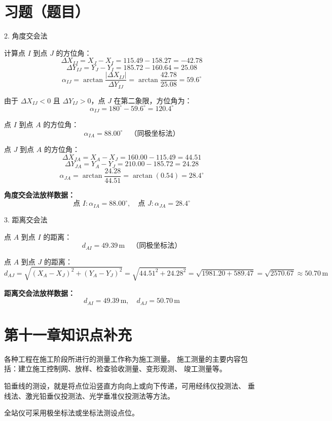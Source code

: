 \documentclass[12pt,a4paper]{article}
\newcounter{question}
\newenvironment{questions}{
    \setcounter{question}{0}
    \section*{习题（题目）}
    \begin{enumerate}[leftmargin=1.5em,label={\arabic*．}]
}{
    \end{enumerate}
}
\begin{document}
\begin{questions}
{2. 角度交会法

计算点 \(I\) 到点 \(J\) 的方位角：
\[
\Delta X_{IJ} = X_J - X_I = 115.49 - 158.27 = -42.78
\]
\[
\Delta Y_{IJ} = Y_J - Y_I = 185.72 - 160.64 = 25.08
\]
\[
\alpha_{IJ} = \arctan \frac{|\Delta X_{IJ}|}{\Delta Y_{IJ}} = \arctan \frac{42.78}{25.08} = 59.6^\circ
\]

由于 \(\Delta X_{IJ} < 0\) 且 \(\Delta Y_{IJ} > 0\)，点 \(J\) 在第二象限，方位角为：
\[
\alpha_{IJ} = 180^\circ - 59.6^\circ = 120.4^\circ
\]

点 \(I\) 到点 \(A\) 的方位角：
\[
\alpha_{IA} = 88.00^\circ \quad \text{（同极坐标法）}
\]

点 \(J\) 到点 \(A\) 的方位角：
\[
\Delta X_{JA} = X_A - X_J = 160.00 - 115.49 = 44.51
\]
\[
\Delta Y_{JA} = Y_A - Y_J = 210.00 - 185.72 = 24.28
\]
\[
\alpha_{JA} = \arctan \frac{24.28}{44.51} = \arctan(0.54) = 28.4^\circ
\]

\vspace{1em}
\textbf{角度交会法放样数据：}  
\[
\text{点 } I: \alpha_{IA} = 88.00^\circ, \quad \text{点 } J: \alpha_{JA} = 28.4^\circ
\]

3. 距离交会法

点 \(A\) 到点 \(I\) 的距离：
\[
d_{AI} = 49.39\,\text{m} \quad \text{（同极坐标法）}
\]

点 \(A\) 到点 \(J\) 的距离：
\[
d_{AJ} = \sqrt{(X_A - X_J)^2 + (Y_A - Y_J)^2} = \sqrt{44.51^2 + 24.28^2} = \sqrt{1981.20 + 589.47} = \sqrt{2570.67} \approx 50.70\,\text{m}
\]

\vspace{1em}
\textbf{距离交会法放样数据：}  
\[
d_{AI} = 49.39\,\text{m}, \quad d_{AJ} = 50.70\,\text{m}
\]


    }
\end{questions}

\section*{第十一章\quad 知识点补充}

各种工程在施工阶段所进行的测量工作称为施工测量。 施工测量的主要内容包括：建立施工控制网、放样、检查验收测量、变形观测、
竣工测量等。 

铅垂线的测设，就是将点位沿竖直方向向上或向下传递，可用经纬仪投测法、
垂线法、激光铅垂仪投测法、光学垂准仪投测法等方法。 

全站仪可采用极坐标法或坐标法测设点位。

\end{document}
